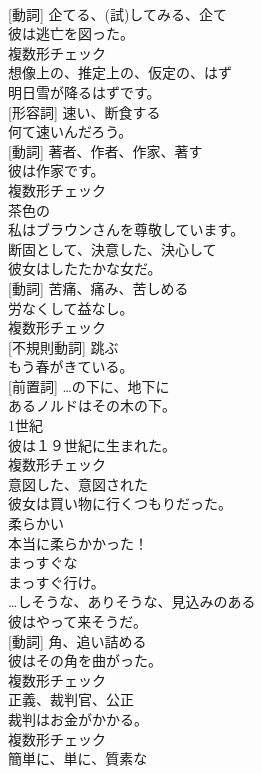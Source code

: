 \documentclass[8pt]{extreport}
\begin{document}
\begin{CJK}{UTF8}{min}
\\	[名詞] [動詞]	企てる、(試)してみる、企て	
\\	彼は逃亡を図った。	
\\	複数形チェック
\\	[形容詞]	想像上の、推定上の、仮定の、はず	
\\	明日雪が降るはずです。	
\\	[動詞] [形容詞]	速い、断食する	
\\	何て速いんだろう。	
\\	[名詞] [動詞]	著者、作者、作家、著す	
\\	彼は作家です。	
\\	複数形チェック
\\	[形容詞]	茶色の	
\\	私はブラウンさんを尊敬しています。	
\\	[形容詞]	断固として、決意した、決心して	
\\	彼女はしたたかな女だ。	
\\	[名詞] [動詞]	苦痛、痛み、苦しめる	
\\	労なくして益なし。	
\\	複数形チェック
\\	[動詞] [不規則動詞]	跳ぶ	
\\	もう春がきている。	
\\	[副詞] [前置詞]	…の下に、地下に	
\\	あるノルドはその木の下。	
\\	[名詞]	1世紀	
\\	彼は１９世紀に生まれた。	
\\	複数形チェック
\\	[形容詞]	意図した、意図された	
\\	彼女は買い物に行くつもりだった。	
\\	[形容詞]	柔らかい	
\\	本当に柔らかかった！	
\\	[形容詞]	まっすぐな	
\\	まっすぐ行け。	
\\	[形容詞]	…しそうな、ありそうな、見込みのある	
\\	彼はやって来そうだ。	
\\	[名詞] [動詞]	角、追い詰める	
\\	彼はその角を曲がった。	
\\	複数形チェック
\\	[名詞]	正義、裁判官、公正	
\\	裁判はお金がかかる。	
\\	複数形チェック
\\	[形容詞]	簡単に、単に、質素な	

\end{CJK}
\end{document}
